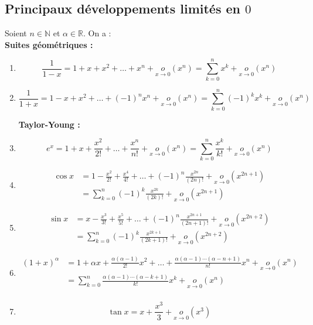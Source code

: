 \subsection{Principaux développements limités en $0$}
\begin{small}
\begin{Prop}
Soient $n \in \mathbb{N}$ et $\alpha \in \mathbb{R}$. On a :\\

\noindent \textbf{Suites géométriques :}\\
\begin{enumerate}

\item
\[
\frac{1}{1 - x} = 1 + x + x^2 + \ldots + x^n + \underset{x \to 0}{o}(x^n) = \sum_{k=0}^{n} x^k +  \underset{x \to 0}{o}(x^n)
\]
\item
\[
\frac{1}{1 + x} = 1 - x + x^2 + \ldots + (-1)^n x^n + \underset{x \to 0}{o}(x^n) = \sum_{k=0}^{n} (-1)^k x^k +  \underset{x \to 0}{o}(x^n)
\]


\noindent \textbf{Taylor-Young :}\\
\item
\[
e^x = 1 + x + \frac{x^2}{2!} + \ldots + \frac{x^n}{n!} +  \underset{x \to 0}{o}(x^n) = \sum_{k=0}^{n} \frac{x^k}{k!} + \underset{x \to 0}{o}(x^n)
\]



\item
\[
\begin{aligned}
\cos x &= 1 - \frac{x^2}{2!} + \frac{x^4}{4!} + \ldots + (-1)^n \frac{x^{2n}}{(2n)!} + \underset{x \to 0}{o}(x^{2n+1})\\
& = \sum_{k=0}^{n} (-1)^k \frac{x^{2k}}{(2k)!} +  \underset{x \to 0}{o}(x^{2n+1})
\end{aligned}
\]


\item
\[
\begin{aligned}
\sin x &= x - \frac{x^3}{3!} + \frac{x^5}{5!} + \ldots + (-1)^n \frac{x^{2n+1}}{(2n+1)!} + \underset{x \to 0}{o}(x^{2n+2})\\
& = \sum_{k=0}^{n} (-1)^k \frac{x^{2k+1}}{(2k+1)!} +  \underset{x \to 0}{o}(x^{2n+2})
\end{aligned}
\]


\item
\[
\begin{aligned}
(1 + x)^{\alpha} &= 1 + \alpha x + \frac{\alpha (\alpha - 1)}{2!} x^2 + \ldots + \frac{\alpha (\alpha - 1) \cdots (\alpha - n + 1)}{n!} x^n +  \underset{x \to 0}{o}(x^n) \\
&= \sum_{k=0}^{n} \frac{\alpha (\alpha - 1) \cdots (\alpha - k + 1)}{k!} x^k +  \underset{x \to 0}{o}(x^n)\\
\end{aligned}
\]
\item 
\[
\tan x = x + \frac{x^3}{3} + \underset{x \to 0}{o}(x^3)
\]



\end{enumerate}
\end{Prop}
\end{small}
